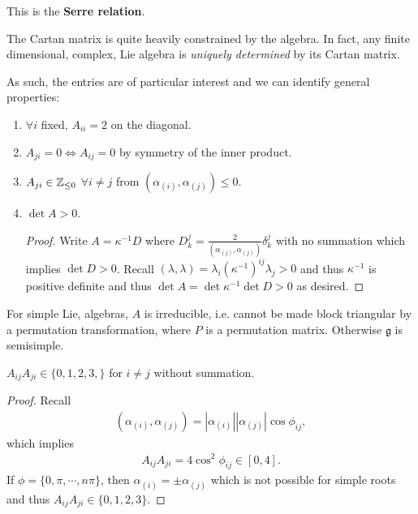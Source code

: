 This is the \textbf{Serre relation}.

The Cartan matrix is quite heavily constrained by the algebra. In fact, any finite dimensional, complex, Lie algebra is \textit{uniquely determined} by its Cartan matrix.

As such, the entries are of particular interest and we can identify general properties:
\begin{enumerate}[label=\roman*)]
    \item $\forall i$ fixed, $A_{i i} = 2$ on the diagonal.
    \item $A_{ji} = 0 \iff A_{ij} = 0$ by symmetry of the inner product.
    \item $A_{ji} \in \mathbb{Z}_{\leq 0}$ $\forall i \neq j$ from $\left( \alpha_{\left( i \right) }, \alpha_{\left( j \right) } \right) \leq 0$.
    \item $\det A > 0$.
        \begin{proof}
            Write $A = \kappa^{-1} D$ where $D^{j}_k = \frac{2}{\left( \alpha_{\left( j \right) }, \alpha_{\left( j \right) } \right) } \delta^{j}_k$ with no summation which implies $\det D > 0$. Recall $\left( \lambda, \lambda \right) = \lambda_i \left( \kappa^{-1} \right)^{ij} \lambda_j > 0$ and thus $\kappa^{-1}$ is positive definite and thus $\det A = \det \kappa^{-1} \det D > 0$ as desired.
        \end{proof}
\end{enumerate}

\begin{proposition}
    For simple Lie, algebras, $A$ is irreducible, i.e. cannot be made block triangular by a permutation transformation, where $P$ is a permutation matrix. Otherwise $\mathfrak{g}$ is semisimple.
\end{proposition}

\begin{claim}
    $A_{ij} A_{ji} \in \{0,1,2,3,\} $ for $i \neq j$ without summation.
\end{claim}

\begin{proof}
    Recall
    \begin{align}
        \left( \alpha_{\left( i \right) }, \alpha_{\left( j \right) } \right) = \left| \alpha_{\left( i \right) } \right| \left| \alpha_{\left( j \right) } \right| \cos \phi_{ij}
    ,\end{align}
    which implies
    \begin{align}
        A_{ij} A_{ji} = 4 \cos^2 \phi_{ij} \in \left[ 0,4 \right]  
    .\end{align}
    If $\phi = \{0, \pi, \cdots, n \pi\}$, then $\alpha_{\left( i \right) } = \pm \alpha_{\left( j \right) }$ which is not possible for simple roots and thus $A_{ij} A_{ji} \in \{0,1,2,3\}$.
\end{proof}


